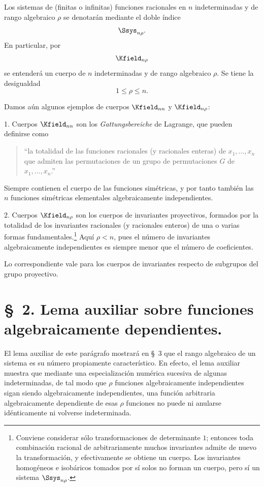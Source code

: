 \documentclass[11pt]{article}
\begin{document}
Los sistemas de (finitas o infinitas) funciones racionales en $n$ indeterminadas y de rango algebraico $\rho$ se denotarán mediante el doble índice
\[
  \Ssys_{n\rho}.
\]
En particular, por
\[
  \Kfield_{n\rho}
\]
se entenderá un cuerpo de $n$ indeterminadas y de rango algebraico $\rho$. Se tiene la desigualdad
\[
  1\leq \rho\leq n.
\]

Damos aún algunos ejemplos de cuerpos $\Kfield_{nn}$ y $\Kfield_{n\rho}$:

1. Cuerpos $\Kfield_{nn}$ son los \emph{Gattungsbereiche} de Lagrange, que pueden definirse como
\begin{quote}
``la totalidad de las funciones racionales (y racionales enteras) de $x_1,\ldots,x_n$ que admiten las permutaciones de un grupo de permutaciones $G$ de $x_1,\ldots,x_n$.''
\end{quote}
Siempre contienen el cuerpo de las funciones simétricas, y por tanto también las $n$ funciones simétricas elementales algebraicamente independientes.

2. Cuerpos $\Kfield_{n\rho}$ son los cuerpos de invariantes proyectivos, formados por la totalidad de los invariantes racionales (y racionales enteros) de una o varias formas fundamentales.\footnote{Conviene considerar sólo transformaciones de determinante $1$; entonces toda combinación racional de arbitrariamente muchos invariantes admite de nuevo la transformación, y efectivamente se obtiene un cuerpo. Los invariantes homogéneos e isobáricos tomados por sí solos no forman un cuerpo, pero sí un sistema $\Ssys_{n\rho}$.} Aquí $\rho<n$, pues el número de invariantes algebraicamente independientes es siempre menor que el número de coeficientes.

Lo correspondiente vale para los cuerpos de invariantes respecto de subgrupos del grupo proyectivo.

\section*{\S\ 2. Lema auxiliar sobre funciones algebraicamente dependientes.}

El lema auxiliar de este parágrafo mostrará en \S\ 3 que el rango algebraico de un sistema es su número propiamente característico. En efecto, el lema auxiliar muestra que mediante una especialización numérica sucesiva de algunas indeterminadas, de tal modo que $\rho$ funciones algebraicamente independientes sigan siendo algebraicamente independientes, una función arbitraria algebraicamente dependiente de esas $\rho$ funciones no puede ni anularse idénticamente ni volverse indeterminada.
\end{document}
